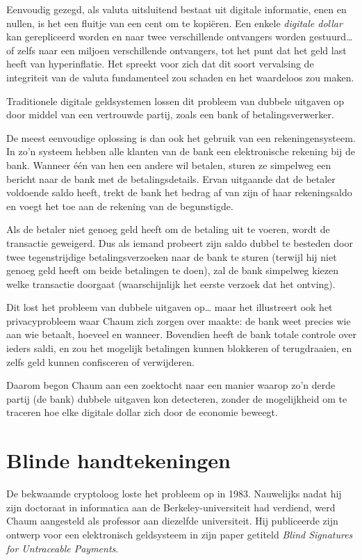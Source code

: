 \documentclass[
  a5paper,
  smalldemyvopaper,11pt,twoside,onecolumn,openright,extrafontsizes,
hidelinks]{memoir}
\begin{document}
Eenvoudig gezegd, als valuta uitsluitend bestaat uit digitale
informatie, enen en nullen, is het een fluitje van een cent om te
kopiëren. Een enkele \emph{digitale dollar} kan gerepliceerd worden en
naar twee verschillende ontvangers worden gestuurd\ldots{} of zelfs naar
een miljoen verschillende ontvangers, tot het punt dat het geld last
heeft van hyperinflatie. Het spreekt voor zich dat dit soort vervalsing
de integriteit van de valuta fundamenteel zou schaden en het waardeloos
zou maken.

Traditionele digitale geldsystemen lossen dit probleem van dubbele
uitgaven op door middel van een vertrouwde partij, zoals een bank of
betalingsverwerker.

De meest eenvoudige oplossing is dan ook het gebruik van een
rekeningensysteem. In zo'n systeem hebben alle klanten van de bank een
elektronische rekening bij de bank. Wanneer één van hen een andere wil
betalen, sturen ze simpelweg een bericht naar de bank met de
betalingsdetails. Ervan uitgaande dat de betaler voldoende saldo heeft,
trekt de bank het bedrag af van zijn of haar rekeningsaldo en voegt het
toe aan de rekening van de begunstigde.

Als de betaler niet genoeg geld heeft om de betaling uit te voeren,
wordt de transactie geweigerd. Dus als iemand probeert zijn saldo dubbel
te besteden door twee tegenstrijdige betalingsverzoeken naar de bank te
sturen (terwijl hij niet genoeg geld heeft om beide betalingen te doen),
zal de bank simpelweg kiezen welke transactie doorgaat (waarschijnlijk
het eerste verzoek dat het ontving).

Dit lost het probleem van dubbele uitgaven op\ldots{} maar het
illustreert ook het privacyprobleem waar Chaum zich zorgen over maakte:
de bank weet precies wie aan wie betaalt, hoeveel en wanneer. Bovendien
heeft de bank totale controle over ieders saldi, en zou het mogelijk
betalingen kunnen blokkeren of terugdraaien, en zelfs geld kunnen
confisceren of verwijderen.

Daarom begon Chaum aan een zoektocht naar een manier waarop zo'n derde
partij (de bank) dubbele uitgaven kon detecteren, zonder de mogelijkheid
om te traceren hoe elke digitale dollar zich door de economie beweegt.

\section{Blinde handtekeningen}\label{blinde-handtekeningen}

De bekwaamde cryptoloog loste het probleem op in 1983. Nauwelijks nadat
hij zijn doctoraat in informatica aan de Berkeley-universiteit had
verdiend, werd Chaum aangesteld als professor aan diezelfde
universiteit. Hij publiceerde zijn ontwerp voor een elektronisch
geldsysteem in zijn paper getiteld \emph{Blind Signatures for
Untraceable Payments}.
\end{document}
